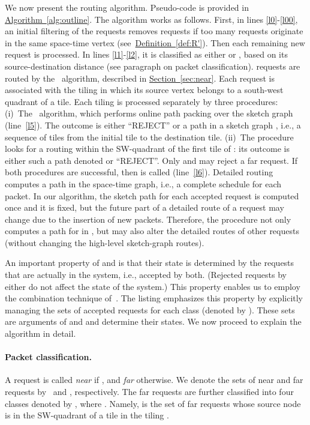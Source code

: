 \documentclass[11pt]{article}
\newcommand{\namedref}[2]{\hyperref[#2]{#1~\ref*{#2}}}
\newcommand{\sectionref}[1]{\namedref{Section}{#1}}
\newcommand{\defref}[1]{\namedref{Definition}{#1}}
\newcommand{\Algref}[1]{\namedref{Algorithm}{#1}}
\newcommand{\route}{\text{\sc{ipp}}\xspace}
\newcommand{\IPP}{\route}
\newcommand{\routenear}{\text{\sc{route-near}}\xspace}
\newenvironment{proof sketch}[1]{\noindent {\emph{Proof sketch of #1:}}}{\hfill \qed}
\newcommand{\far}{\text{\emph{Far}}\xspace}
\newcommand{\near}{\text{\emph{Near}}\xspace}
\begin{document}
We now present the routing algorithm. Pseudo-code is provided in
\Algref{alg:outline}.  The algorithm works as follows. First, in lines
\ref{l0}-\ref{l00}, an initial filtering of the requests removes requests if too many
requests originate in the same space-time vertex (see~\defref{def:R'}). Then each
remaining new request is processed. In lines \ref{l1}-\ref{l2}, it is classified as
either \near or \far, based on its source-destination distance (see paragraph on
packet classification).  \near requests are routed by the \routenear\ algorithm,
described in \sectionref{sec:near}.
Each \far request is associated with the tiling
 in which its source vertex belongs to a south-west quadrant of a tile. Each
tiling is processed separately by three procedures: (i)~The \IPP\ algorithm, which
performs online path packing over the sketch graph  (line~\ref{l5}). The outcome
 is either ``REJECT'' or a path in a sketch graph , i.e., a sequence
of tiles from the initial tile to the destination tile.  (ii)~The 
procedure looks for a routing within the SW-quadrant of the first tile of : its
outcome is either such a path denoted  or ``REJECT''. Only  and
 may reject a far request. If both procedures are
successful, then  is called (line~\ref{l6}). Detailed routing computes a path in
the space-time graph, i.e., a complete schedule for each packet.  In our algorithm,
the sketch path for each accepted request is computed once and it is fixed, but
the future part of a detailed route of a request may change due to the insertion of new packets.
Therefore, the procedure  not only computes a path for  in
, but may also alter the detailed routes of other requests (without changing
the high-level sketch-graph routes).

An important property of  and  is that their state
is determined by the requests that are actually in the system, i.e.,
accepted by both.  (Rejected requests by either do not affect the
state of the system.)  This property enables us to employ the
combination technique of~\cite{KT}.  The listing emphasizes this
property by explicitly managing the sets of accepted requests for
each class (denoted by ). These sets are arguments of
 and  and determine their states. We now proceed to
explain the algorithm in detail.


\paragraph{Packet classification\ifnum{}.\fi}
A request  is called \emph{near} if , and
\emph{far} otherwise. We denote the sets of near and far requests by \near\ and \far,
respectively. The far requests are further classified into four classes denoted by
, where . Namely,  is the set of far
requests whose source node is in the SW-quadrant of a tile  in the tiling .
\end{document}
